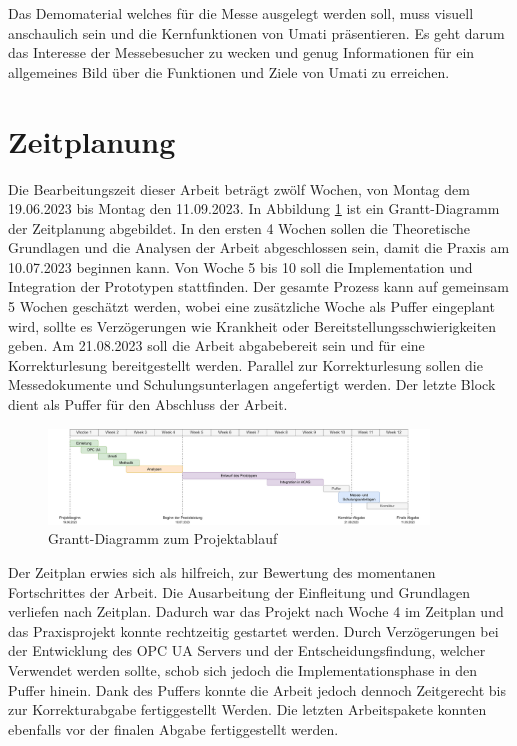\documentclass[a4paper, 12pt, oneside, toc=listofnumbered, bibliography=totoc]{scrbook}
\begin{document}
	Das Demomaterial welches für die Messe ausgelegt werden soll, muss visuell anschaulich sein und die Kernfunktionen von \ac{Umati} präsentieren. Es geht darum das Interesse der Messebesucher zu wecken und genug Informationen für ein allgemeines Bild über die Funktionen und Ziele von \ac{Umati} zu erreichen. 
	
	
	\section{Zeitplanung}
	
	Die Bearbeitungszeit dieser Arbeit beträgt zwölf Wochen, von Montag dem 19.06.2023 bis Montag den 11.09.2023. In Abbildung \ref{fig:Grantt} ist ein Grantt-Diagramm der Zeitplanung abgebildet. In den ersten 4 Wochen sollen die Theoretische Grundlagen und die Analysen der Arbeit abgeschlossen sein, damit die Praxis am 10.07.2023 beginnen kann. Von Woche 5 bis 10 soll die Implementation und Integration der Prototypen stattfinden. Der gesamte Prozess kann auf gemeinsam 5 Wochen geschätzt werden, wobei eine zusätzliche Woche als Puffer eingeplant wird, sollte es Verzögerungen wie Krankheit oder Bereitstellungsschwierigkeiten geben. Am 21.08.2023 soll die Arbeit abgabebereit sein und für eine Korrekturlesung bereitgestellt werden. Parallel zur Korrekturlesung sollen die Messedokumente und Schulungsunterlagen angefertigt werden. Der letzte Block dient als Puffer für den Abschluss der Arbeit.
	
	\begin{figure}[H]
		\centering
		\includegraphics[width=0.9\textwidth]{res/analysen/Grantt-Diagramm.pdf}
		\caption{Grantt-Diagramm zum Projektablauf}
		\label{fig:Grantt}
	\end{figure}
	
	Der Zeitplan erwies sich als hilfreich, zur Bewertung des momentanen Fortschrittes der Arbeit. Die Ausarbeitung der Einfleitung und Grundlagen verliefen nach Zeitplan. Dadurch war das Projekt nach Woche 4 im Zeitplan und das Praxisprojekt konnte rechtzeitig gestartet werden. Durch Verzögerungen bei der Entwicklung des OPC UA Servers und der Entscheidungsfindung, welcher Verwendet werden sollte, schob sich jedoch die Implementationsphase in den Puffer hinein. Dank des Puffers konnte die Arbeit jedoch dennoch Zeitgerecht bis zur Korrekturabgabe fertiggestellt Werden. Die letzten Arbeitspakete konnten ebenfalls vor der finalen Abgabe fertiggestellt werden.  
	
\end{document}
